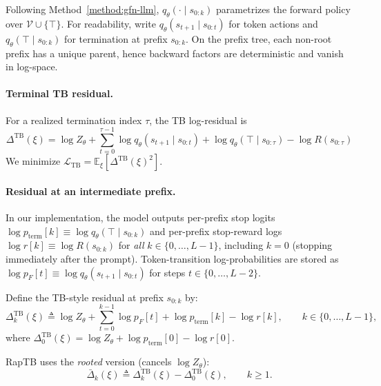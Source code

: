 \documentclass{article}
\theoremstyle{plain}
\theoremstyle{definition}
\theoremstyle{remark}
\begin{document}
Following Method~\ref{method:gfn-llm}, $q_\theta(\cdot\mid s_{0:k})$ parametrizes the forward policy over
$\mathcal{V}\cup\{\top\}$. For readability, write
$q_\theta(s_{t+1}\mid s_{0:t})$ for token actions and $q_\theta(\top\mid s_{0:k})$ for termination at prefix $s_{0:k}$.
On the prefix tree, each non-root prefix has a unique parent, hence backward factors are deterministic and vanish in log-space.

\paragraph{Terminal TB residual.}
For a realized termination index $\tau$, the TB log-residual is
\begin{equation}
\label{eq:app_tb_llm}
\Delta^{\mathrm{TB}}(\xi)
=
\log Z_\theta
+\sum_{t=0}^{\tau-1}\log q_\theta(s_{t+1}\mid s_{0:t}) + \log q_\theta(\top\mid s_{0:\tau}) - \log R(s_{0:\tau})
\end{equation}
We minimize $\mathcal{L}_{\mathrm{TB}}=\mathbb{E}_\xi[\Delta^{\mathrm{TB}}(\xi)^2]$.

\paragraph{Residual at an intermediate prefix.}
In our implementation, the model outputs per-prefix stop logits $\log p_{\mathrm{term}}[k] \equiv \log q_\theta(\top\mid s_{0:k})$
and per-prefix stop-reward logs $\log r[k] \equiv \log R(s_{0:k})$ for \emph{all} $k\in\{0,\dots,L{-}1\}$,
including $k=0$ (stopping immediately after the prompt).
Token-transition log-probabilities are stored as $\log p_F[t]\equiv \log q_\theta(s_{t+1}\mid s_{0:t})$ for steps
$t\in\{0,\dots,L{-}2\}$.

Define the TB-style residual at prefix $s_{0:k}$ by:
\begin{equation}
\label{eq:app_stop_res_k_new}
\Delta_k^{\mathrm{TB}}(\xi)
\triangleq
\log Z_\theta
+\sum_{t=0}^{k-1}\log p_F[t]
+\log p_{\mathrm{term}}[k]
-\log r[k],
\qquad k\in\{0,\dots,L{-}1\},
\end{equation}
where
$\Delta_0^{\mathrm{TB}}(\xi)=\log Z_\theta+\log p_{\mathrm{term}}[0]-\log r[0]$.

RapTB uses the \emph{rooted} version (cancels $\log Z_\theta$):
\begin{equation}
\label{eq:app_rooted_def_new}
\bar\Delta_k(\xi)
\triangleq
\Delta_k^{\mathrm{TB}}(\xi)-\Delta_0^{\mathrm{TB}}(\xi),
\qquad k\ge 1.
\end{equation}
\end{document}
